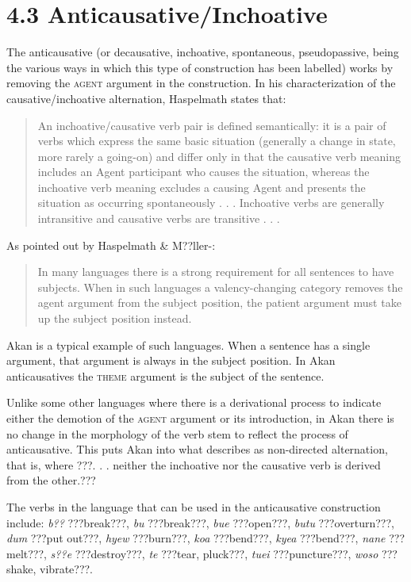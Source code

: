 \documentclass[output=paper]{langsci/langscibook}
\begin{document}
\section{4.3  Anticausative/Inchoative}

The anticausative (or decausative, inchoative, spontaneous, pseudopassive, being the various ways in which this type of construction has been labelled) works by removing the \textsc{agent} argument in the construction. In his characterization of the causative/inchoative alternation, Haspelmath states that:

\begin{quote}
An inchoative/causative verb pair is defined semantically: it is a pair of verbs which express the same basic situation (generally a change in state, more rarely a going-on) and differ only in that the causative verb meaning includes an Agent participant who causes the situation, whereas the inchoative verb meaning excludes a causing Agent and presents the situation as occurring spontaneously . . . Inchoative verbs are generally intransitive and causative verbs are transitive . . . \citep[90]{Haspelmath1993}
\end{quote}

As pointed out by Haspelmath \& M??ller-\citet[1132]{Bardey2004}: 

\begin{quote}
In many languages there is a strong requirement for all sentences to have subjects. When in such languages a valency-changing category removes the agent argument from the subject position, the patient argument must take up the subject position instead.
\end{quote}

Akan is a typical example of such languages. When a sentence has a single argument, that argument is always in the subject position. In Akan anticausatives the \textsc{theme} argument is the subject of the sentence. 

Unlike some other languages where there is a derivational process to indicate either the demotion of the \textsc{agent} argument or its introduction, in Akan there is no change in the morphology of the verb stem to reflect the process of anticausative. This puts Akan into what \citet[91]{Haspelmath1993} describes as non-directed alternation, that is, where ???. . . neither the inchoative nor the causative verb is derived from the other.???

The verbs in the language that can be used in the anticausative construction include: \emph{b??} ???break???, \emph{bu} ???break???, \emph{bue} ???open???, \emph{butu} ???overturn???, \emph{dum} ???put out???, \emph{hyew} ???burn???, \emph{koa} ???bend???, \emph{kyea} ???bend???, \emph{nane} ???melt???, \emph{s??e} ???destroy???, \emph{te} ???tear, pluck???, \emph{tuei} ???puncture???, \emph{woso} ???shake, vibrate???. 
\end{document}
